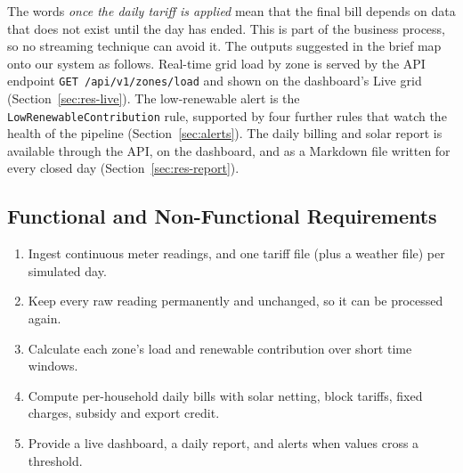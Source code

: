 \documentclass[11pt,a4paper]{article}
\begin{document}
The words \emph{once the daily tariff is applied} mean that the final bill depends on data
that does not exist until the day has ended. This is part of the business process, so no
streaming technique can avoid it. The outputs suggested in the brief map onto our system as
follows. Real-time grid load by zone is served by the API endpoint
\texttt{GET /api/v1/zones/load} and shown on the dashboard's Live grid
(Section~\ref{sec:res-live}). The low-renewable alert is the
\texttt{LowRenewableContribution} rule, supported by four further rules that watch the
health of the pipeline (Section~\ref{sec:alerts}). The daily billing and solar report is
available through the API, on the dashboard, and as a Markdown file written for every closed
day (Section~\ref{sec:res-report}).

\subsection{Functional and Non-Functional Requirements}

\begin{enumerate}[label=\textbf{F\arabic*.},leftmargin=2.2em]
  \item Ingest continuous meter readings, and one tariff file (plus a weather file) per
        simulated day.
  \item Keep every raw reading permanently and unchanged, so it can be processed again.
  \item Calculate each zone's load and renewable contribution over short time windows.
  \item Compute per-household daily bills with solar netting, block tariffs, fixed
        charges, subsidy and export credit.
  \item Provide a live dashboard, a daily report, and alerts when values cross a threshold.
\end{enumerate}
\end{document}
